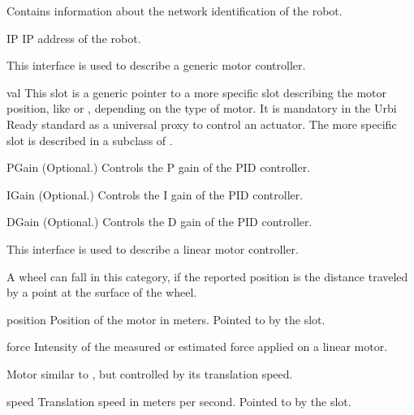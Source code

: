 
Contains information about the network identification of the robot.

\begin{urbiscriptapi}
\item[IP] IP address of the robot.
\end{urbiscriptapi}


This interface is used to describe a generic motor controller.

\begin{urbiscriptapi}
\item[val] This slot is a generic pointer to a more specific slot describing
  the motor position, like  or , depending on the
  type of motor. It is mandatory in the Urbi Ready standard as a universal
  proxy to control an actuator. The more specific slot is described in a
  subclass of .
\item[PGain] (Optional.) Controls the P gain of the PID controller.
\item[IGain] (Optional.) Controls the I gain of the PID controller.
\item[DGain] (Optional.) Controls the D gain of the PID controller.
\end{urbiscriptapi}



This interface is used to describe a linear motor controller.

A wheel can fall in this category, if the reported position is the distance
traveled by a point at the surface of the wheel.

\begin{urbiscriptapi}
\item[position] Position of the motor in meters.  Pointed to by the
   slot.

\item[force] Intensity of the measured or estimated force applied on a
  linear motor.
\end{urbiscriptapi}


Motor similar to , but controlled by its translation speed.

\begin{urbiscriptapi}
\item[speed] Translation speed in meters per second. Pointed to by the
   slot.
\end{urbiscriptapi}


